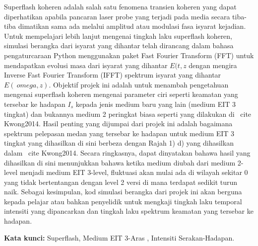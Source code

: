 
Superflash koheren adalah salah satu fenomena transien koheren yang dapat diperhatikan apabila pancaran laser probe yang terjadi pada media secara tiba-tiba dimatikan sama ada melalui amplitud atau modulasi fasa isyarat kejadian. Untuk mempelajari lebih lanjut mengenai tingkah laku superflash koheren, simulasi berangka dari isyarat yang dihantar telah dirancang dalam bahasa pengaturcaraan Python menggunakan paket Fast Fourier Transform (FFT) untuk mendapatkan evolusi masa dari isyarat yang dihantar $ E (t, z $ dengan mengira Inverse Fast Fourier Transform (IFFT) spektrum isyarat yang dihantar $ E (\ omega, z) $. Objektif projek ini adalah untuk menambah pengetahuan mengenai superflash koheren mengenai parameter ciri seperti keamatan yang tersebar ke hadapan $ I_ {s} $ kepada jenis medium baru yang lain (medium EIT 3 tingkat) dan bukannya medium 2 peringkat biasa seperti yang dilakukan di \ cite {Kwong2014}. Hasil penting yang dijumpai dari projek ini adalah bagaimana spektrum pelepasan medan yang tersebar ke hadapan untuk medium EIT 3 tingkat yang dihasilkan di sini berbeza dengan Rajah 1) d) yang dihasilkan dalam \ cite {Kwong2014}. Secara ringkasnya, dapat dinyatakan bahawa hasil yang dihasilkan di sini menunjukkan bahawa ketika medium diubah dari medium 2-level menjadi medium EIT 3-level, fluktuasi akan mulai ada di wilayah sekitar 0 yang tidak bertentangan dengan level 2 versi di mana terdapat sedikit turun naik. Sebagai kesimpulan, kod simulasi berangka dari projek ini akan berguna kepada pelajar atau bahkan penyelidik untuk mengkaji tingkah laku temporal intensiti yang dipancarkan dan tingkah laku spektrum keamatan yang tersebar ke hadapan.

\textbf{Kata kunci:} Superflash, Medium EIT 3-Aras , Intensiti Serakan-Hadapan.
